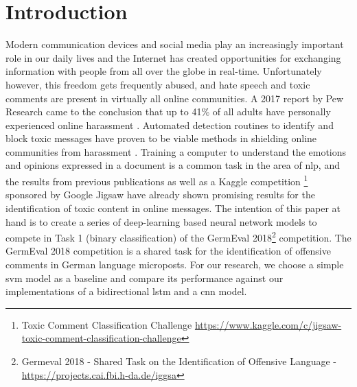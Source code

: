 \documentclass[11pt]{article}
\begin{document}
\section{Introduction}
Modern communication devices and social media play an increasingly important role in our daily lives and the Internet has created opportunities for exchanging information with people from all over the globe in real-time. Unfortunately however, this freedom gets frequently abused, and hate speech and toxic comments are present in virtually all online communities. A 2017 report by Pew Research came to the conclusion that up to 41\% of all adults have personally experienced online harassment \cite{RN63}.
\newline
Automated detection routines to identify and block toxic messages have proven to be viable methods in shielding online communities from harassment \cite{RN27}. Training a computer to understand the emotions and opinions expressed in a document is a common task in the area of \ac{nlp}, and the results from previous publications  \cite{RN14} as well as a Kaggle competition \footnote{Toxic Comment Classification Challenge \url{https://www.kaggle.com/c/jigsaw-toxic-comment-classification-challenge}} sponsored by Google Jigsaw have already shown promising results for the identification of toxic content in online messages.
\newline
The intention of this paper at hand is to create a series of deep-learning based neural network models to compete in Task 1 (binary classification) of the GermEval 2018\footnote{\label{footnote:germ2018}Germeval 2018 - Shared Task on the Identification of Offensive Language - \url{https://projects.cai.fbi.h-da.de/iggsa}} competition. The GermEval 2018 competition is a shared task for the identification of offensive comments in German language microposts. For our research, we choose a simple \ac{svm} model as a baseline and compare its performance against our implementations of a bidirectional \ac{lstm} and a \ac{cnn} model. 
\end{document}
